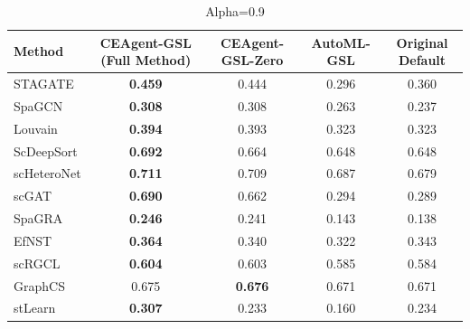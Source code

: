 \begin{table}[htbp]
\centering
\begin{tabular}{lcccc}
\toprule
Method & CEAgent-GSL (Full Method) & CEAgent-GSL-Zero & AutoML-GSL & Original Default \\
\midrule
STAGATE & \textbf{0.459} & 0.444 & 0.296 & 0.360 \\
SpaGCN & \textbf{0.308} & 0.308 & 0.263 & 0.237 \\
Louvain & \textbf{0.394} & 0.393 & 0.323 & 0.323 \\
ScDeepSort & \textbf{0.692} & 0.664 & 0.648 & 0.648 \\
scHeteroNet & \textbf{0.711} & 0.709 & 0.687 & 0.679 \\
scGAT & \textbf{0.690} & 0.662 & 0.294 & 0.289 \\
SpaGRA & \textbf{0.246} & 0.241 & 0.143 & 0.138 \\
EfNST & \textbf{0.364} & 0.340 & 0.322 & 0.343 \\
scRGCL & \textbf{0.604} & 0.603 & 0.585 & 0.584 \\
GraphCS & 0.675 & \textbf{0.676} & 0.671 & 0.671 \\
stLearn & \textbf{0.307} & 0.233 & 0.160 & 0.234 \\
\bottomrule
\end{tabular}
\caption{Alpha=0.9}
\label{tab:exp1}
\end{table}
